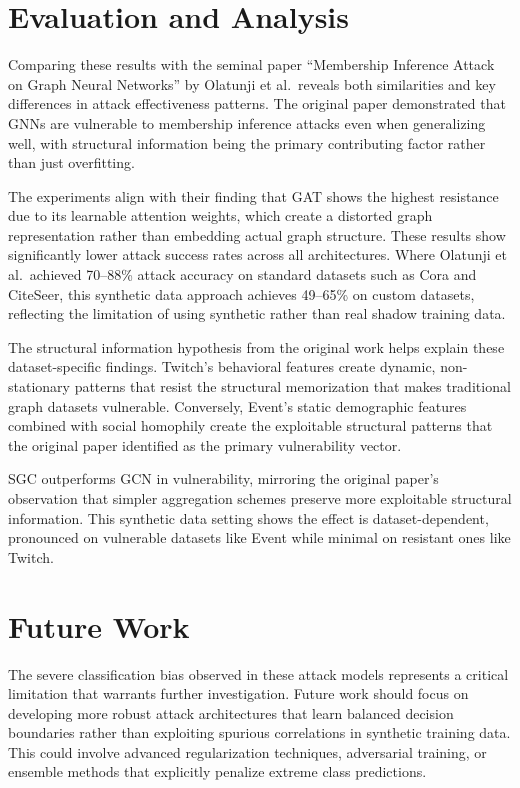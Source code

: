 \documentclass{article}
\begin{document}
\section{Evaluation and Analysis}

Comparing these results with the seminal paper ``Membership Inference Attack on Graph Neural Networks'' by Olatunji et al.\ reveals both similarities and key differences in attack effectiveness patterns. The original paper demonstrated that GNNs are vulnerable to membership inference attacks even when generalizing well, with structural information being the primary contributing factor rather than just overfitting.

The experiments align with their finding that GAT shows the highest resistance due to its learnable attention weights, which create a distorted graph representation rather than embedding actual graph structure. These results show significantly lower attack success rates across all architectures. Where Olatunji et al.\ achieved 70--88\% attack accuracy on standard datasets such as Cora and CiteSeer, this synthetic data approach achieves 49--65\% on custom datasets, reflecting the limitation of using synthetic rather than real shadow training data.

The structural information hypothesis from the original work helps explain these dataset-specific findings. Twitch's behavioral features create dynamic, non-stationary patterns that resist the structural memorization that makes traditional graph datasets vulnerable. Conversely, Event's static demographic features combined with social homophily create the exploitable structural patterns that the original paper identified as the primary vulnerability vector.

SGC outperforms GCN in vulnerability, mirroring the original paper's observation that simpler aggregation schemes preserve more exploitable structural information. This synthetic data setting shows the effect is dataset-dependent, pronounced on vulnerable datasets like Event while minimal on resistant ones like Twitch.

\section{Future Work}

The severe classification bias observed in these attack models represents a critical limitation that warrants further investigation. Future work should focus on developing more robust attack architectures that learn balanced decision boundaries rather than exploiting spurious correlations in synthetic training data. This could involve advanced regularization techniques, adversarial training, or ensemble methods that explicitly penalize extreme class predictions.
\end{document}
